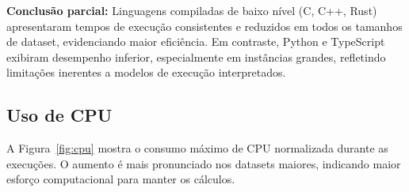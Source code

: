 \documentclass[12pt, a4paper]{article}
\begin{document}
\begin{table}[H]
    \centering
    \caption{Tempo médio de execução (em segundos) e desvio-padrão por linguagem e tamanho do dataset (geral, sem NP-Completo).}
    \label{tab:tempo_execucao_geral_sem_npcomp}
\end{table}

\textbf{Conclusão parcial:} Linguagens compiladas de baixo nível (C, C++, Rust) apresentaram tempos de execução consistentes e reduzidos em todos os tamanhos de dataset, evidenciando maior eficiência. Em contraste, Python e TypeScript exibiram desempenho inferior, especialmente em instâncias grandes, refletindo limitações inerentes a modelos de execução interpretados.

\subsection{Uso de CPU}

A Figura~\ref{fig:cpu} mostra o consumo máximo de CPU normalizada durante as execuções. O aumento é mais pronunciado nos datasets maiores, indicando maior esforço computacional para manter os cálculos.
\end{document}
